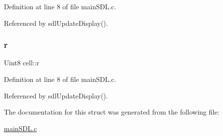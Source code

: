 Definition at line 8 of file main\+S\+D\+L.\+c.



Referenced by sdl\+Update\+Display().

\mbox{\label{structcell_a8cefee0153ea06b2465c1142c467b3e0}} 
\subsubsection{\texorpdfstring{r}{r}}
{\footnotesize\ttfamily Uint8 cell\+::r}



Definition at line 8 of file main\+S\+D\+L.\+c.



Referenced by sdl\+Update\+Display().



The documentation for this struct was generated from the following file\+:\begin{DoxyCompactItemize}
\item 
\hyperlink{mainSDL_8c}{main\+S\+D\+L.\+c}\end{DoxyCompactItemize}
